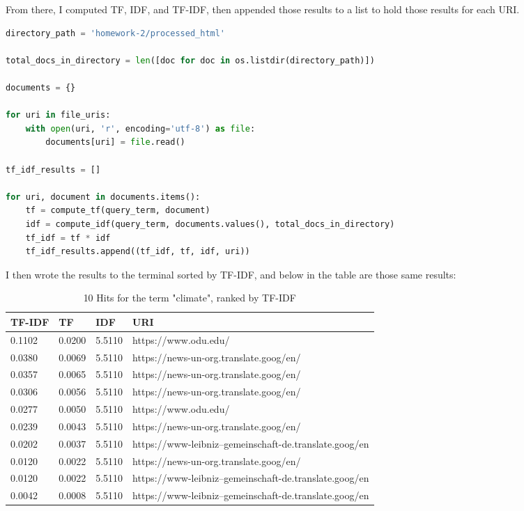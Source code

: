 \documentclass[12pt]{article}
\begin{document}
From there, I computed TF, IDF, and TF-IDF, then appended those results to a list to hold those results for each URI. 

\begin{lstlisting}[language=Python]
directory_path = 'homework-2/processed_html'

total_docs_in_directory = len([doc for doc in os.listdir(directory_path)])

documents = {}

for uri in file_uris:
    with open(uri, 'r', encoding='utf-8') as file:
        documents[uri] = file.read()

tf_idf_results = []

for uri, document in documents.items():
    tf = compute_tf(query_term, document)
    idf = compute_idf(query_term, documents.values(), total_docs_in_directory)
    tf_idf = tf * idf
    tf_idf_results.append((tf_idf, tf, idf, uri))
\end{lstlisting}

I then wrote the results to the terminal sorted by TF-IDF, and below in the table are those same results:

\begin{table}[h]
\centering
\caption{10 Hits for the term "climate", ranked by TF-IDF}
\label{tbl:simple}
\begin{tabular}{|l|l|l|l|}
\hline
\textbf{TF-IDF} & \textbf{TF} & \textbf{IDF} & \textbf{URI} \\ \hline \hline
0.1102 & 0.0200 & 5.5110 & https://www.odu.edu/ \\ \hline
0.0380 & 0.0069 & 5.5110 & https://news-un-org.translate.goog/en/ \\ \hline
0.0357 & 0.0065 & 5.5110 & https://news-un-org.translate.goog/en/ \\ \hline
0.0306 & 0.0056 & 5.5110 & https://news-un-org.translate.goog/en/ \\ \hline
0.0277 & 0.0050 & 5.5110 & https://www.odu.edu/ \\ \hline
0.0239 & 0.0043 & 5.5110 & https://news-un-org.translate.goog/en/ \\ \hline
0.0202 & 0.0037 & 5.5110 & https://www-leibniz--gemeinschaft-de.translate.goog/en \\ \hline
0.0120 & 0.0022 & 5.5110 & https://news-un-org.translate.goog/en/ \\ \hline
0.0120 & 0.0022 & 5.5110 & https://www-leibniz--gemeinschaft-de.translate.goog/en \\ \hline
0.0042 & 0.0008 & 5.5110 & https://www-leibniz--gemeinschaft-de.translate.goog/en \\ \hline
\end{tabular}
\end{table}
\end{document}
